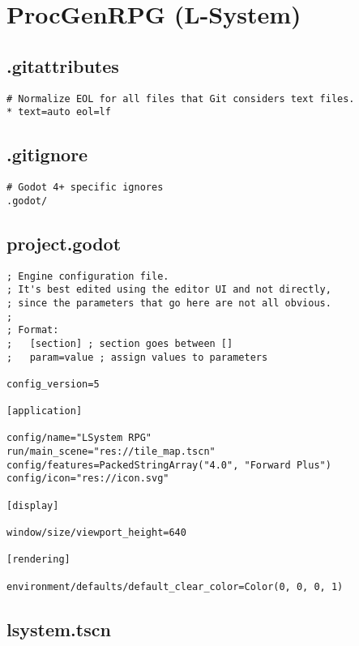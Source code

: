 \section{ProcGenRPG (L-System)}


\subsection{.gitattributes}

\begin{lstlisting}
# Normalize EOL for all files that Git considers text files.
* text=auto eol=lf
\end{lstlisting}

\subsection{.gitignore}

\begin{lstlisting}
# Godot 4+ specific ignores
.godot/
\end{lstlisting}

\subsection{project.godot}

\begin{lstlisting}
; Engine configuration file.
; It's best edited using the editor UI and not directly,
; since the parameters that go here are not all obvious.
;
; Format:
;   [section] ; section goes between []
;   param=value ; assign values to parameters

config_version=5

[application]

config/name="LSystem RPG"
run/main_scene="res://tile_map.tscn"
config/features=PackedStringArray("4.0", "Forward Plus")
config/icon="res://icon.svg"

[display]

window/size/viewport_height=640

[rendering]

environment/defaults/default_clear_color=Color(0, 0, 0, 1)
\end{lstlisting}

\subsection{l\textunderscore{}system.tscn}

